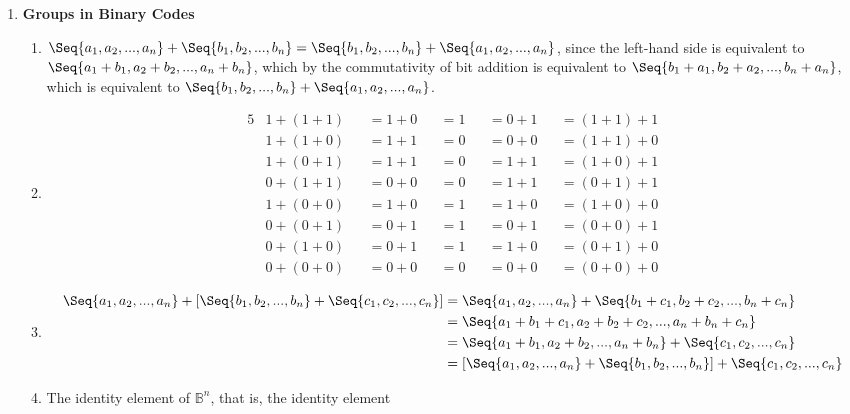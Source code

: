 \begin{enumerate}[label={\Alph*.},font={\bfseries}]
\begin{figure}[h]
  \end{figure}
\item {\bf Groups in Binary Codes}
  \begin{enumerate}[label={\arabic*},font={\bfseries}]
  \item $\Seq{a_1,a_2,...,a_n} + \Seq{b_1,b_2,...,b_n} = \Seq{b_1,b_2,...,b_n} + \Seq{a_1,a_2,...,a_n}$,
    since the left-hand side is equivalent to $\Seq{a_1+b_1,a_2+b_2,...,a_n+b_n}$,
    which by the commutativity of bit addition is equivalent to $\Seq{b_1+a_1,b_2+a_2,...,b_n+a_n}$,
    which is equivalent to $\Seq{b_1,b_2,...,b_n} + \Seq{a_1,a_2,...,a_n}$.
  \item
    \begin{alignat*}{5}
      &1 + (1 + 1) &&= 1 + 0 &&= 1 &&= 0 + 1 &&= (1 + 1) + 1 \\
      &1 + (1 + 0) &&= 1 + 1 &&= 0 &&= 0 + 0 &&= (1 + 1) + 0 \\
      &1 + (0 + 1) &&= 1 + 1 &&= 0 &&= 1 + 1 &&= (1 + 0) + 1 \\
      &0 + (1 + 1) &&= 0 + 0 &&= 0 &&= 1 + 1 &&= (0 + 1) + 1 \\
      &1 + (0 + 0) &&= 1 + 0 &&= 1 &&= 1 + 0 &&= (1 + 0) + 0 \\
      &0 + (0 + 1) &&= 0 + 1 &&= 1 &&= 0 + 1 &&= (0 + 0) + 1 \\
      &0 + (1 + 0) &&= 0 + 1 &&= 1 &&= 1 + 0 &&= (0 + 1) + 0 \\
      &0 + (0 + 0) &&= 0 + 0 &&= 0 &&= 0 + 0 &&= (0 + 0) + 0
    \end{alignat*}
  \item
    \begin{align*}
      \Seq{a_1,a_2,...,a_n} + \left[\Seq{b_1,b_2,...,b_n} + \Seq{c_1,c_2,...,c_n}\right]
      &= \Seq{a_1,a_2,...,a_n} + \Seq{b_1+c_1,b_2+c_2,...,b_n+c_n} \\
      &= \Seq{a_1+b_1+c_1,a_2+b_2+c_2,...,a_n+b_n+c_n} \\
      &= \Seq{a_1+b_1,a_2+b_2,...,a_n+b_n} + \Seq{c_1,c_2,...,c_n} \\
      &= \left[\Seq{a_1,a_2,...,a_n} + \Seq{b_1,b_2,...,b_n}\right] + \Seq{c_1,c_2,...,c_n}
    \end{align*}
    \item The identity element of $\mathbb{B}^n$, that is, the identity element

\end{enumerate}
\end{enumerate}
